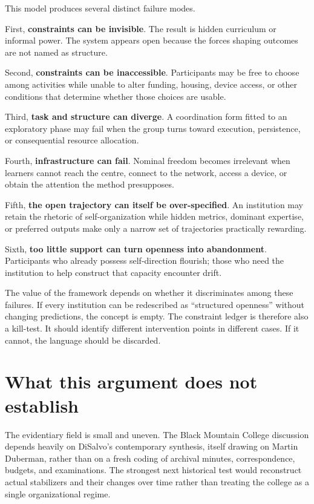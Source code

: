 \documentclass[11pt]{article}
\begin{document}
This model produces several distinct failure modes.

First, \textbf{constraints can be invisible}. The result is hidden curriculum or informal power. The system appears open because the forces shaping outcomes are not named as structure.

Second, \textbf{constraints can be inaccessible}. Participants may be free to choose among activities while unable to alter funding, housing, device access, or other conditions that determine whether those choices are usable.

Third, \textbf{task and structure can diverge}. A coordination form fitted to an exploratory phase may fail when the group turns toward execution, persistence, or consequential resource allocation.

Fourth, \textbf{infrastructure can fail}. Nominal freedom becomes irrelevant when learners cannot reach the centre, connect to the network, access a device, or obtain the attention the method presupposes.

Fifth, \textbf{the open trajectory can itself be over-specified}. An institution may retain the rhetoric of self-organization while hidden metrics, dominant expertise, or preferred outputs make only a narrow set of trajectories practically rewarding.

Sixth, \textbf{too little support can turn openness into abandonment}. Participants who already possess self-direction flourish; those who need the institution to help construct that capacity encounter drift.

The value of the framework depends on whether it discriminates among these failures. If every institution can be redescribed as ``structured openness'' without changing predictions, the concept is empty. The constraint ledger is therefore also a kill-test. It should identify different intervention points in different cases. If it cannot, the language should be discarded.

\section{What this argument does not establish}

The evidentiary field is small and uneven. The Black Mountain College discussion depends heavily on DiSalvo's contemporary synthesis, itself drawing on Martin Duberman, rather than on a fresh coding of archival minutes, correspondence, budgets, and examinations. The strongest next historical test would reconstruct actual stabilizers and their changes over time rather than treating the college as a single organizational regime.
\end{document}
